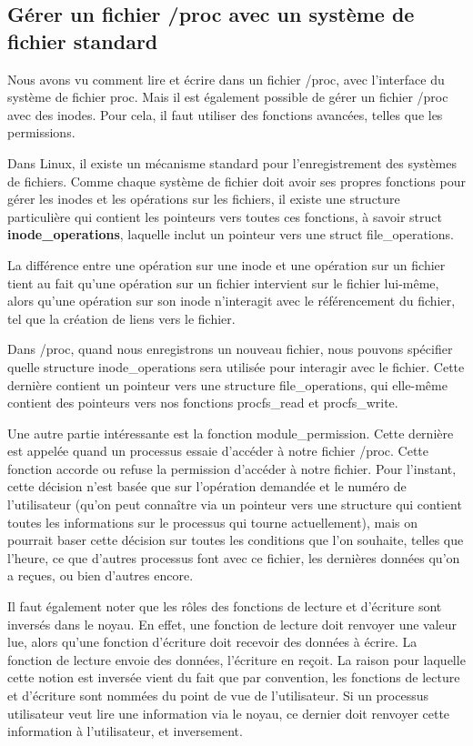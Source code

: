 \documentclass[11pt]{article}
\begin{document}
\subsection*{Gérer un fichier /proc avec un système de fichier standard}
\label{sec-7-2}

Nous avons vu comment lire et écrire dans un fichier /proc, avec l'interface du système de fichier proc. Mais il est également possible de gérer un fichier /proc avec des inodes. Pour cela, il faut utiliser des fonctions avancées, telles que les permissions.

Dans Linux, il existe un mécanisme standard pour l'enregistrement des systèmes de fichiers. Comme chaque système de fichier doit avoir ses propres fonctions pour gérer les inodes et les opérations sur les fichiers, il existe une structure particulière qui contient les pointeurs vers toutes ces fonctions, à savoir struct \textbf{inode\_operations}, laquelle inclut un pointeur vers une struct file\_operations.

La différence entre une opération sur une inode et une opération sur un fichier tient au fait qu'une opération sur un fichier intervient sur le fichier lui-même, alors qu'une opération sur son inode n'interagit avec le référencement du fichier, tel que la création de liens vers le fichier.

Dans /proc, quand nous enregistrons un nouveau fichier, nous pouvons spécifier quelle structure inode\_operations sera utilisée pour interagir avec le fichier. Cette dernière contient un pointeur vers une structure file\_operations, qui elle-même contient des pointeurs vers nos fonctions procfs\_read et procfs\_write.

Une autre partie intéressante est la fonction module\_permission. Cette dernière est appelée quand un processus essaie d'accéder à notre fichier /proc. Cette fonction accorde ou refuse la permission d'accéder à notre fichier. Pour l'instant, cette décision n'est basée que sur l'opération demandée et le numéro de l'utilisateur (qu'on peut connaître via un pointeur vers une structure qui contient toutes les informations sur le processus qui tourne actuellement), mais on pourrait baser cette décision sur toutes les conditions que l'on souhaite, telles que l'heure, ce que d'autres processus font avec ce fichier, les dernières données qu'on a reçues, ou bien d'autres encore.

Il faut également noter que les rôles des fonctions de lecture et d'écriture sont inversés dans le noyau. En effet, une fonction de lecture doit renvoyer une valeur lue, alors qu'une fonction d'écriture doit recevoir des données à écrire. La fonction de lecture envoie des données, l'écriture en reçoit. La raison pour laquelle cette notion est inversée vient du fait que par convention, les fonctions de lecture et d'écriture sont nommées du point de vue de l'utilisateur. Si un processus utilisateur veut lire une information via le noyau, ce dernier doit renvoyer cette information à l'utilisateur, et inversement.
\end{document}
